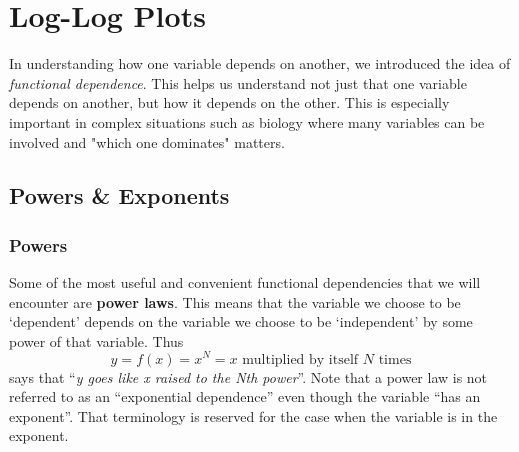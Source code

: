 \chapter{Log-Log Plots}
\thispagestyle{fancy}

In understanding how one variable depends on another, we introduced the idea of \emph{functional dependence}.
This helps us understand not just that one variable depends on another, but how it depends on the other.
This is especially important in complex situations such as biology where many variables can be involved and "which one dominates" matters.

\section{Powers \& Exponents}

\subsection*{Powers}
Some of the most useful and convenient functional dependencies that we will encounter are \textbf{power laws}.
This means that the variable we choose to be `dependent' depends on the variable we choose to be `independent' by some power of that variable.
Thus
\[ y = f(x) = x^{N} = x \text{ multiplied by itself } N \text{ times} \]
says that ``\emph{y goes like x raised to the Nth power}''.
Note that a power law is not referred to as an ``exponential dependence'' even though the variable ``has an exponent''.
That terminology is reserved for the case when the variable is in the exponent.

